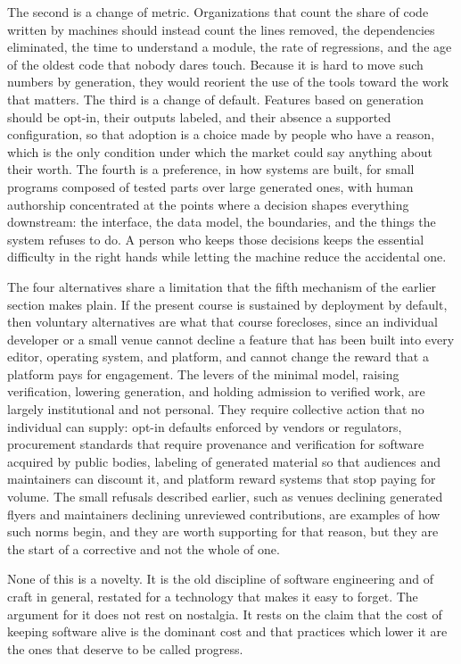\documentclass[11pt,a4paper]{article}
\theoremstyle{remark}
\begin{document}
The second is a change of metric. Organizations that count the share of code written by machines should instead count the lines removed, the dependencies eliminated, the time to understand a module, the rate of regressions, and the age of the oldest code that nobody dares touch. Because it is hard to move such numbers by generation, they would reorient the use of the tools toward the work that matters. The third is a change of default. Features based on generation should be opt-in, their outputs labeled, and their absence a supported configuration, so that adoption is a choice made by people who have a reason, which is the only condition under which the market could say anything about their worth. The fourth is a preference, in how systems are built, for small programs composed of tested parts over large generated ones, with human authorship concentrated at the points where a decision shapes everything downstream: the interface, the data model, the boundaries, and the things the system refuses to do. A person who keeps those decisions keeps the essential difficulty in the right hands while letting the machine reduce the accidental one.

The four alternatives share a limitation that the fifth mechanism of the earlier section makes plain. If the present course is sustained by deployment by default, then voluntary alternatives are what that course forecloses, since an individual developer or a small venue cannot decline a feature that has been built into every editor, operating system, and platform, and cannot change the reward that a platform pays for engagement. The levers of the minimal model, raising verification, lowering generation, and holding admission to verified work, are largely institutional and not personal. They require collective action that no individual can supply: opt-in defaults enforced by vendors or regulators, procurement standards that require provenance and verification for software acquired by public bodies, labeling of generated material so that audiences and maintainers can discount it, and platform reward systems that stop paying for volume. The small refusals described earlier, such as venues declining generated flyers and maintainers declining unreviewed contributions, are examples of how such norms begin, and they are worth supporting for that reason, but they are the start of a corrective and not the whole of one.

None of this is a novelty. It is the old discipline of software engineering and of craft in general, restated for a technology that makes it easy to forget. The argument for it does not rest on nostalgia. It rests on the claim that the cost of keeping software alive is the dominant cost and that practices which lower it are the ones that deserve to be called progress.
\end{document}
